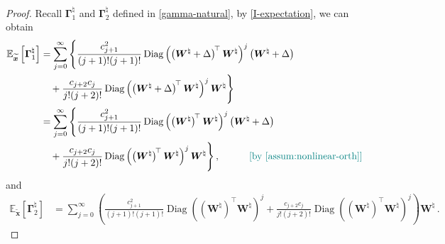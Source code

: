 \begin{proof}
Recall $\bm \Gamma^\natural_{1}$ and $\bm \Gamma^\natural_{2}$ defined in \cref{gamma-natural}, by \cref{I-expectation}, we can obtain
\begin{align*}
    \mathbb{E}_{\widetilde{\bm x}}\left[\bm \Gamma^\natural_{1}\right] & = \sum_{j= 0}^{\infty}\Bigg\{\frac{c_{j+1}^2}{(j+1)!(j+1)!}\operatorname{Diag}\left(\left(\bm W^\natural+\Delta\right)^{\!\top}\bm W^\natural\right)^j \left(\bm W^\natural+\Delta\right)\\
    & \quad +\frac{c_{j+2}c_{j}}{j!(j+2)!}\operatorname{Diag}\left(\left(\bm W^\natural+\Delta\right)^{\!\top}\bm W^\natural\right)^j \bm W^\natural\Bigg\}\\
    & = \sum_{j= 0}^{\infty}\Bigg\{\frac{c_{j+1}^2}{(j+1)!(j+1)!}\operatorname{Diag}\left(\left(\bm W^\natural\right)^{\!\top}\bm W^\natural\right)^j \left(\bm W^\natural+\Delta\right) \\
    &\quad +\frac{c_{j+2}c_{j}}{j!(j+2)!}\operatorname{Diag}\left(\left(\bm W^\natural\right)^{\!\top}\bm W^\natural\right)^j \bm W^\natural\Bigg\}\,, \quad \tag*{\color{teal}[by \cref{assum:nonlinear-orth}]}
\end{align*}
and
\begin{align*}
    \mathbb{E}_{\widetilde{\bm x}}\left[\bm \Gamma^\natural_{2}\right] & = \sum_{j= 0}^{\infty} \left(\frac{c_{j+1}^2}{(j+1)!(j+1)!}\operatorname{Diag}\left(\left(\bm W^\natural\right)^{\!\top}\bm W^\natural\right)^j  +\frac{c_{j+2}c_{j}}{j!(j+2)!}\operatorname{Diag}\left(\left(\bm W^\natural\right)^{\!\top}\bm W^\natural\right)^j \right)\bm W^\natural\,.
\end{align*}


\end{proof}
